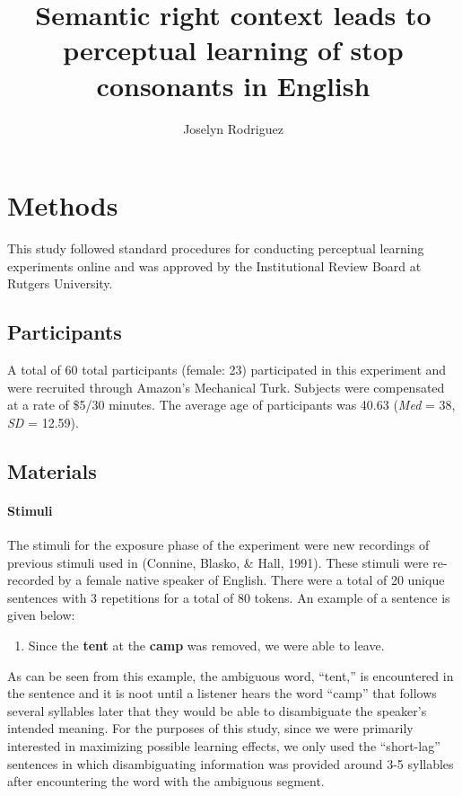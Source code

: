 \documentclass[
  english,
  man]{apa6}
\title{Semantic right context leads to perceptual learning of stop consonants in English}
\author{Joselyn Rodriguez\textsuperscript{}}
\date{}
\affiliation{\phantom{0}}
\providecommand{\tightlist}{%
  \setlength{\itemsep}{0pt}\setlength{\parskip}{0pt}}
\let\oldparagraph\paragraph
\renewcommand{\paragraph}[1]{\oldparagraph{#1}\mbox{}}
\begin{document}
\maketitle

\hypertarget{methods}{%
\section{Methods}\label{methods}}

This study followed standard procedures for conducting perceptual learning experiments online and was approved by the Institutional Review Board at Rutgers University.

\hypertarget{participants}{%
\subsection{Participants}\label{participants}}

A total of 60 total participants (female: 23) participated in this experiment and were recruited through Amazon's Mechanical Turk. Subjects were compensated at a rate of \$5/30 minutes. The average age of participants was 40.63 (\emph{Med} = 38, \emph{SD} = 12.59).

\hypertarget{materials}{%
\subsection{Materials}\label{materials}}

\hypertarget{stimuli}{%
\paragraph{Stimuli}\label{stimuli}}

The stimuli for the exposure phase of the experiment were new recordings of previous stimuli used in (Connine, Blasko, \& Hall, 1991). These stimuli were re-recorded by a female native speaker of English. There were a total of 20 unique sentences with 3 repetitions for a total of 80 tokens. An example of a sentence is given below:

\begin{enumerate}
\def\labelenumi{(\arabic{enumi})}
\tightlist
\item
  Since the \textbf{tent} at the \textbf{camp} was removed, we were able to leave.
\end{enumerate}

As can be seen from this example, the ambiguous word, ``tent,'' is encountered in the sentence and it is noot until a listener hears the word ``camp'' that follows several syllables later that they would be able to disambiguate the speaker's intended meaning. For the purposes of this study, since we were primarily interested in maximizing possible learning effects, we only used the ``short-lag'' sentences in which disambiguating information was provided around 3-5 syllables after encountering the word with the ambiguous segment.
\end{document}
